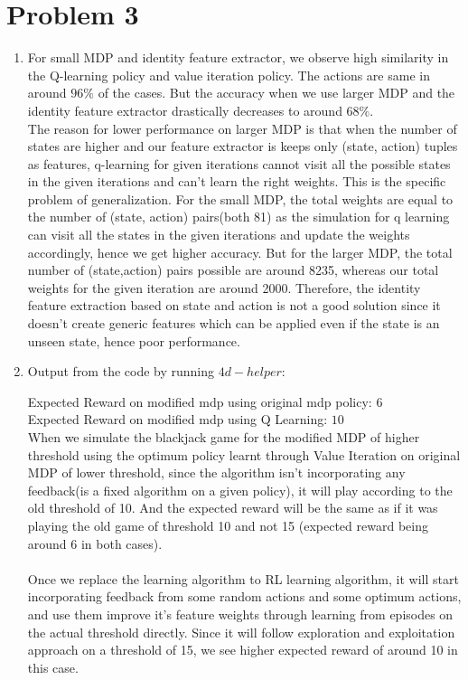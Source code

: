 \documentclass[12pt]{article}
\begin{document}
\section*{Problem 3}

\begin{enumerate}[label=(\alph*)]
	\addtocounter{enumi}{1}
	\item For small MDP and identity feature extractor, we observe high similarity in the Q-learning policy and value iteration policy. The actions are same in around $96\%$ of the cases.  But the accuracy when we use larger MDP and the identity feature extractor drastically decreases to around $68\%$. \\
	The reason for lower performance on larger MDP is that when the number of states are higher and our feature extractor is keeps only (state, action) tuples as features, q-learning for given iterations cannot visit all the possible states in the given iterations and can't learn the right weights. This is the specific problem of generalization. For the small MDP, the total weights are equal to the number of (state, action) pairs(both 81) as the simulation for q learning can visit all the states in the given iterations and update the weights accordingly, hence we get higher accuracy. But for the larger MDP, the total number of (state,action) pairs possible are around 8235, whereas our total weights for the given iteration are around 2000. Therefore, the identity feature extraction based on state and action is not a good solution since it doesn't create generic features which can be applied even if the state is an unseen state, hence poor performance.
	\addtocounter{enumi}{1}
	\item Output from the code by running $4d-helper$:
	
	Expected Reward on modified mdp using original mdp policy: $6$ \\
	Expected Reward on modified mdp using Q Learning: $10$ \\
	
	When we simulate the blackjack game for the modified MDP of higher threshold using the optimum policy learnt through Value Iteration on original MDP of lower threshold, since the algorithm isn't incorporating any feedback(is a fixed algorithm on a given policy), it will play according to the old threshold of 10. And the expected reward will be the same as if it was playing the old game of threshold 10 and not 15 (expected reward being around 6 in both cases). \\ \\
	Once we replace the learning algorithm to RL learning algorithm, it will start incorporating feedback from some random actions and some optimum actions, and use them improve it's feature weights through learning from episodes on the actual threshold directly. Since it will follow exploration and exploitation approach on a threshold of 15, we see higher expected reward of around 10 in this case.
\end{enumerate}
\end{document}
